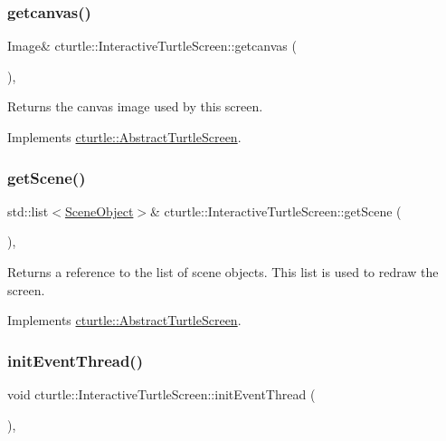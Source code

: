 \subsubsection{\texorpdfstring{getcanvas()}{getcanvas()}}
{\footnotesize\ttfamily Image\& cturtle\+::\+Interactive\+Turtle\+Screen\+::getcanvas (\begin{DoxyParamCaption}{ }\end{DoxyParamCaption})\hspace{0.3cm}{\ttfamily [inline]}, {\ttfamily [virtual]}}

Returns the canvas image used by this screen. 

Implements \hyperlink{classcturtle_1_1AbstractTurtleScreen}{cturtle\+::\+Abstract\+Turtle\+Screen}.

\mbox{\label{classcturtle_1_1InteractiveTurtleScreen_aa1bd826458a718e7605424d5767f79c9}} 
\subsubsection{\texorpdfstring{get\+Scene()}{getScene()}}
{\footnotesize\ttfamily std\+::list$<$\hyperlink{structcturtle_1_1SceneObject}{Scene\+Object}$>$\& cturtle\+::\+Interactive\+Turtle\+Screen\+::get\+Scene (\begin{DoxyParamCaption}{ }\end{DoxyParamCaption})\hspace{0.3cm}{\ttfamily [inline]}, {\ttfamily [virtual]}}

Returns a reference to the list of scene objects. This list is used to redraw the screen. 

Implements \hyperlink{classcturtle_1_1AbstractTurtleScreen}{cturtle\+::\+Abstract\+Turtle\+Screen}.

\mbox{\label{classcturtle_1_1InteractiveTurtleScreen_aa7c436f89d052e42500356ee5f479776}} 
\subsubsection{\texorpdfstring{init\+Event\+Thread()}{initEventThread()}}
{\footnotesize\ttfamily void cturtle\+::\+Interactive\+Turtle\+Screen\+::init\+Event\+Thread (\begin{DoxyParamCaption}{ }\end{DoxyParamCaption})\hspace{0.3cm}{\ttfamily [inline]}, {\ttfamily [protected]}}

